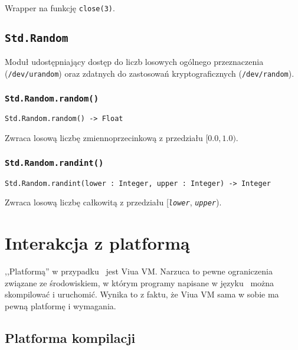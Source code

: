 Wrapper na funkcję \texttt{close(3)}.


\subsection{\texttt{Std.Random}}
\label{stdlib_Std_Random}

Moduł udostępniający dostęp do liczb losowych ogólnego przeznaczenia (\texttt{/dev/urandom}) oraz zdatnych do
zastosowań kryptograficznych (\texttt{/dev/random}).

\subsubsection{\texttt{Std.Random.random()}}

\begin{small}
\begin{lstlisting}
Std.Random.random() -> Float
\end{lstlisting}
\end{small}

Zwraca losową liczbę zmiennoprzecinkową z przedziału $[0.0, 1.0)$.

\subsubsection{\texttt{Std.Random.randint()}}

\begin{small}
\begin{lstlisting}
Std.Random.randint(lower : Integer, upper : Integer) -> Integer
\end{lstlisting}
\end{small}

Zwraca losową liczbę całkowitą z przedziału [\texttt{\emph{lower}}, \texttt{\emph{upper}}).

\section{Interakcja z platformą}

,,Platformą'' w przypadku \ViuAct\ jest Viua VM. Narzuca to pewne ograniczenia związane ze środowiskiem, w
którym programy napisane w języku \ViuAct\ można skompilować i uruchomić. Wynika to z faktu, że Viua VM sama w
sobie ma pewną platformę i wymagania.

\subsection{Platforma kompilacji}

